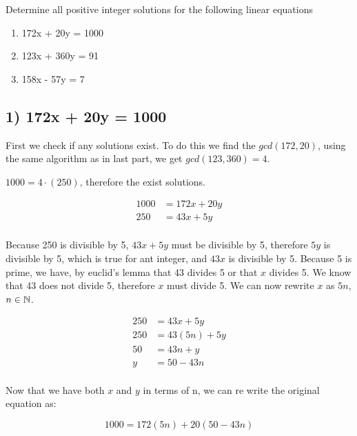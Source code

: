 \documentclass[12pt]{article} %
\begin{document}
\begin{homeworkProblem}
    \begin{grayBoxed}
        Determine all positive integer solutions for the following linear equations

        \begin{enumerate}
            \item 172x + 20y = 1000
            \item 123x + 360y = 91
            \item 158x - 57y = 7
        \end{enumerate}
    \end{grayBoxed}

    \subsection*{1) 172x + 20y = 1000}

    First we check if any solutions exist. To do this we find the $gcd(172, 20)$, using the same algorithm as in last part, we get $gcd(123, 360) = 4$.

    $1000 = 4 \cdot (250)$, therefore the exist solutions.

    \begin{align*}
        1000 & = 172x + 20y \\
        250  & = 43x + 5y   \\
    \end{align*}

    Because 250 is divisible by 5, $43x + 5y$ must be divisible by 5, therefore $5y$ is divisible by 5, which is true for ant integer, and $43x$ is divisible by 5. Because 5 is prime, we have, by euclid's lemma
    that 43 divides 5 or that $x$ divides 5. We know that 43 does not divide 5, therefore $x$ must divide 5. We can now rewrite $x$ as $5n$, $n \in \mathbb{N}$.

    \begin{align*}
        250 & = 43x + 5y    \\
        250 & = 43(5n) + 5y \\
        50  & = 43n + y     \\
        y   & = 50 - 43n    \\
    \end{align*}

    Now that we have both $x$ and $y$ in terms of n, we can re write the original equation as:

    $$
        1000 =  172(5n) + 20(50 - 43n)
    $$


\end{homeworkProblem}
\end{document}
